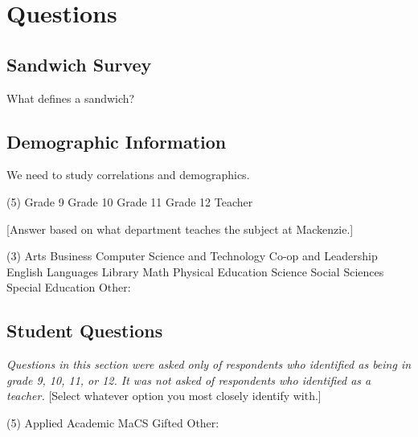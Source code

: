\chapter{Questions}

\section{Sandwich Survey}
	What defines a sandwich?

\section{Demographic Information}
	We need to study correlations and demographics.

	\begin{singlechoice}(5)
		\choice Grade 9
		\choice Grade 10
		\choice Grade 11
		\choice Grade 12
		\choice Teacher
	\end{singlechoice}
	
	[Answer based on what department teaches the subject at Mackenzie.]
	\begin{multiplechoice}(3)
		\choice Arts
		\choice Business
		\choice Computer Science and Technology
		\choice Co-op and Leadership
		\choice English
		\choice Languages
		\choice Library
		\choice Math
		\choice Physical Education
		\choice Science
		\choice Social Sciences
		\choice Special Education
		\choice Other: \blank
	\end{multiplechoice}
	

\section{Student Questions}
	\textit{Questions in this section were asked only of respondents who identified as being in grade 9, 10, 11, or 12.
	It was not asked of respondents who identified as a teacher.}
	[Select whatever option you most closely identify with.]
	\begin{singlechoice}(5)
		\choice Applied
		\choice Academic
		\choice MaCS
		\choice Gifted
		\choice Other: \blank
	\end{singlechoice}

